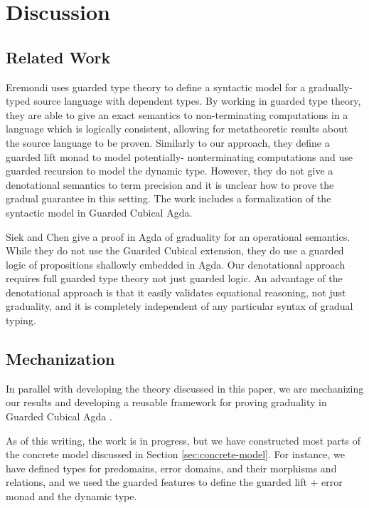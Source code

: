 \section{Discussion}

\subsection{Related Work}
Eremondi \cite{Eremondi_2023} uses guarded type theory to
define a syntactic model for a gradually-typed source
language with dependent types. By working in guarded type theory, they are
able to give an exact semantics to non-terminating computations in a language
which is logically consistent, allowing for metatheoretic results about the
source language to be proven.
%
Similarly to our approach, they define a guarded lift monad to model potentially-
nonterminating computations and use guarded recursion to model the dynamic type.
However, they do not give a denotational semantics to term precision and it is unclear
how to prove the gradual guarantee in this setting.
The work includes a formalization of the syntactic model in Guarded Cubical Agda.

Siek and Chen \cite{siekchen2021} give a proof in Agda of graduality
for an operational semantics. While they do not use the Guarded
Cubical extension, they do use a guarded logic of propositions
shallowly embedded in Agda. Our denotational approach requires full
guarded type theory not just guarded logic. An advantage of the
denotational approach is that it easily validates equational
reasoning, not just graduality, and it is completely independent of
any particular syntax of gradual typing.

\subsection{Mechanization}
In parallel with developing the theory discussed in this paper,
we are mechanizing our results and developing a reusable framework
for proving graduality in Guarded Cubical Agda \cite{veltri-vezzosi2020}.

As of this writing, the work is in progress, but we have
constructed most parts of the concrete model discussed in
Section \ref{sec:concrete-model}. For instance, we have defined
types for predomains, error domains, and their morphisms and relations,
and we used the guarded features to define the guarded lift + error monad
and the dynamic type.

